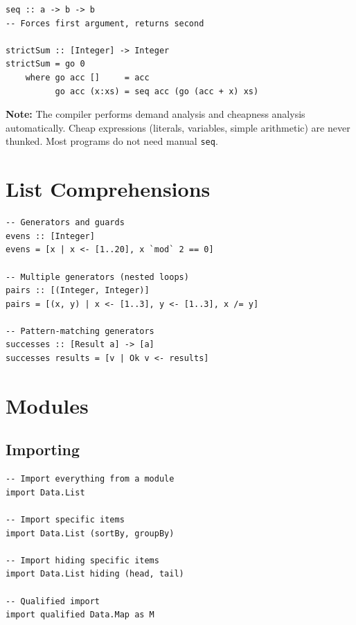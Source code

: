 \documentclass[11pt,a4paper]{article}
\newenvironment{note}{%
  \def\FrameCommand{\fboxsep=3mm \colorbox{notebg}}%
  \MakeFramed{\advance\hsize-\width \FrameRestore}%
  \noindent\textbf{Note:} }%
  {\endMakeFramed}
\begin{document}
\begin{lstlisting}
seq :: a -> b -> b
-- Forces first argument, returns second

strictSum :: [Integer] -> Integer
strictSum = go 0
    where go acc []     = acc
          go acc (x:xs) = seq acc (go (acc + x) xs)
\end{lstlisting}

\begin{note}
The compiler performs demand analysis and cheapness analysis automatically.
Cheap expressions (literals, variables, simple arithmetic) are never
thunked.  Most programs do not need manual \texttt{seq}.
\end{note}

\section{List Comprehensions}

\begin{lstlisting}
-- Generators and guards
evens :: [Integer]
evens = [x | x <- [1..20], x `mod` 2 == 0]

-- Multiple generators (nested loops)
pairs :: [(Integer, Integer)]
pairs = [(x, y) | x <- [1..3], y <- [1..3], x /= y]

-- Pattern-matching generators
successes :: [Result a] -> [a]
successes results = [v | Ok v <- results]
\end{lstlisting}

\section{Modules}

\subsection{Importing}

\begin{lstlisting}
-- Import everything from a module
import Data.List

-- Import specific items
import Data.List (sortBy, groupBy)

-- Import hiding specific items
import Data.List hiding (head, tail)

-- Qualified import
import qualified Data.Map as M
\end{lstlisting}
\end{document}
